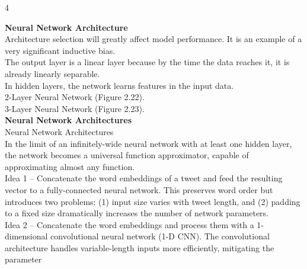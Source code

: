 \documentclass[8pt]{extarticle}
\begin{document}
\begin{multicols}{4}
{\vspace{2pt}\textbf{Neural Network Architecture}\\
Architecture selection will greatly affect model performance. It is an example of a very significant inductive bias.\\
The output layer is a linear layer because by the time the data reaches it, it is already linearly separable.\\
In hidden layers, the network learns features in the input data.\\
2-Layer Neural Network (Figure 2.22).\\
3-Layer Neural Network (Figure 2.23).\\
\vspace{2pt}\textbf{Neural Network Architectures}\\
Neural Network Architectures\\
In the limit of an infinitely-wide neural network with at least one hidden layer, the network becomes a universal function approximator, capable of approximating almost any function.\\
Idea 1 -- Concatenate the word embeddings of a tweet and feed the resulting vector to a fully-connected neural network. This preserves word order but introduces two problems: (1) input size varies with tweet length, and (2) padding to a fixed size dramatically increases the number of network parameters.\\
Idea 2 -- Concatenate the word embeddings and process them with a 1-dimensional convolutional neural network (1-D CNN). The convolutional architecture handles variable-length inputs more efficiently, mitigating the parameter

}
\end{multicols}
\end{document}
